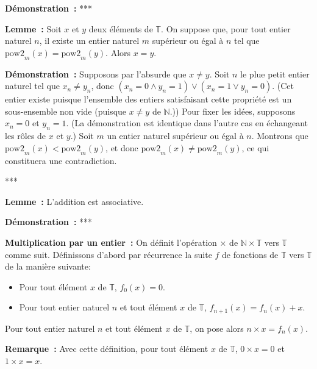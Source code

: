 \medskip

\noindent\textbf{Démonstration :} ***

\medskip

\noindent\textbf{Lemme :} Soit $x$ et $y$ deux éléments de $\mathbb{T}$. 
    On suppose que, pour tout entier naturel $n$, il existe un entier naturel $m$ supérieur ou égal à $n$ tel que $\mathrm{pow2}_m(x) = \mathrm{pow2}_m(y)$.
    Alors $x = y$. 

\medskip

\noindent\textbf{Démonstration :} Supposons par l'absurde que $x \neq y$. 
    Soit $n$ le plue petit  entier naturel tel que $x_n \neq y_n$, donc $(x_n = 0 \wedge y_n = 1) \vee (x_n = 1 \vee y_n = 0)$. 
    (Cet entier existe puisque l'ensemble des entiers satisfaisant cette propriété est un sous-ensemble non vide (puisque $x \neq y$ de $\mathbb{N}$.))
    Pour fixer les idées, supposons $x_n = 0$ et $y_n = 1$. 
    (La démonstration est identique dans l'autre cas en échangeant les rôles de $x$ et $y$.)
    Soit $m$ un entier naturel supérieur ou égal à $n$. 
    Montrons que $\mathrm{pow2}_m(x) < \mathrm{pow2}_m(y)$, et donc $\mathrm{pow2}_m(x) \neq \mathrm{pow2}_m(y)$, ce qui constituera une contradiction.

    ***

\medskip

\noindent\textbf{Lemme :} L'addition est associative.

\medskip

\noindent\textbf{Démonstration :} ***

\medskip

\noindent\textbf{Multiplication par un entier :} On définit l'opération $\times$ de $\mathbb{N} \times \mathbb{T}$ vers $\mathbb{T}$ comme suit. 
    Définissons d'abord par récurrence la suite $f$ de fonctions de $\mathbb{T}$ vers $\mathbb{T}$ de la manière suivante: 
    \begin{itemize}[nosep]
        \item Pour tout élément $x$ de $\mathbb{T}$, $f_0(x) = 0$.
        \item Pour tout entier naturel $n$ et tout élément $x$ de $\mathbb{T}$, $f_{n+1}(x) = f_n(x) + x$.
    \end{itemize}
    Pour tout entier naturel $n$ et tout élément $x$ de $\mathbb{T}$, on pose alors $n \times x = f_n(x)$.

\medskip

\noindent\textbf{Remarque :} Avec cette définition, pour tout élément $x$ de $\mathbb{T}$, $0 \times x = 0$ et $1 \times x = x$.

